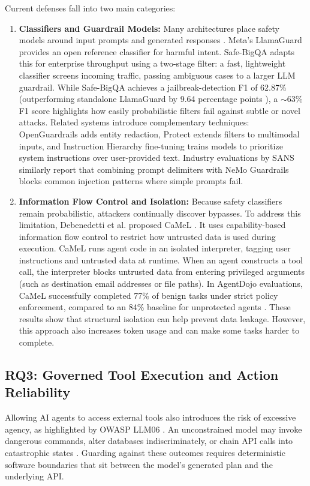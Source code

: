 \documentclass[sigconf]{acmart}
\begin{document}
Current defenses fall into two main categories:
\begin{enumerate}
  \item \textbf{Classifiers and Guardrail Models:} Many architectures place safety models around input prompts and generated responses \cite{dong2024systematicguardrails,dong2025safeguardingsurvey}. Meta's LlamaGuard \cite{inan2023llamaguard} provides an open reference classifier for harmful intent. Safe-BigQA \cite{moraes2026safebigqa} adapts this for enterprise throughput using a two-stage filter: a fast, lightweight classifier screens incoming traffic, passing ambiguous cases to a larger LLM guardrail. While Safe-BigQA achieves a jailbreak-detection F1 of 62.87\% (outperforming standalone LlamaGuard by 9.64 percentage points \cite{moraes2026safebigqa}), a $\sim$63\% F1 score highlights how easily probabilistic filters fail against subtle or novel attacks. Related systems introduce complementary techniques: OpenGuardrails \cite{wang2025openguardrails} adds entity redaction, Protect \cite{avinash2025protect} extends filters to multimodal inputs, and Instruction Hierarchy fine-tuning \cite{wallace2024hierarchy} trains models to prioritize system instructions over user-provided text. Industry evaluations by SANS \cite{mcwherter2024safeguardingai} similarly report that combining prompt delimiters with NeMo Guardrails blocks common injection patterns where simple prompts fail.
  \item \textbf{Information Flow Control and Isolation:} Because safety classifiers remain probabilistic, attackers continually discover bypasses. To address this limitation, Debenedetti et al. proposed CaMeL \cite{debenedetti2026camel}. It uses capability-based information flow control to restrict how untrusted data is used during execution. CaMeL runs agent code in an isolated interpreter, tagging user instructions and untrusted data at runtime. When an agent constructs a tool call, the interpreter blocks untrusted data from entering privileged arguments (such as destination email addresses or file paths). In AgentDojo evaluations, CaMeL successfully completed 77\% of benign tasks under strict policy enforcement, compared to an 84\% baseline for unprotected agents \cite{debenedetti2026camel}. These results show that structural isolation can help prevent data leakage. However, this approach also increases token usage and can make some tasks harder to complete.
\end{enumerate}

\subsection{RQ3: Governed Tool Execution and Action Reliability}
Allowing AI agents to access external tools also introduces the risk of excessive agency, as highlighted by OWASP LLM06 \cite{owasp2025llm}. An unconstrained model may invoke dangerous commands, alter databases indiscriminately, or chain API calls into catastrophic states \cite{ruan2024toolemu}. Guarding against these outcomes requires deterministic software boundaries that sit between the model's generated plan and the underlying API.
\end{document}
